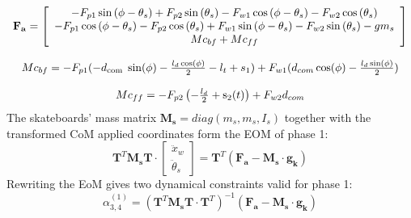 \footnotesize
\begin{equation}\label{e_Fi}
\begin{array}{c}
    \mathbf{F_{a}}= \left[\begin{array}{c}
-F_{p 1} \sin \left(\phi-\theta_s\right)+F_{p 2} \sin \left(\theta_s\right)-F_{w 1} \cos \left(\phi-\theta_s\right)-F_{w 2} \cos \left(\theta_s\right) \\
-F_{p 1} \cos \left(\phi-\theta_s\right)-F_{p 2} \cos \left(\theta_s\right)+F_{w 1} \sin \left(\phi-\theta_s\right)-F_{w 2} \sin \left(\theta_s\right)-g m_s \\
Mc_{bf} + Mc_{ff}
\end{array}\right] 
\\ \\
Mc_{bf} = -F_{p 1} (-d_{\text {com }} \sin (\phi)-\frac{l_d \cos (\phi)}{2}-l_t+s_1)+F_{w 1}(d_{c o m} \cos (\phi)-\frac{l_d \sin (\phi)}{2})
\\ \\
\footnotesize Mc_{ff} = -F_{p 2}\left(-\frac{l_d}{2}+\mathrm{s}_2(t)\right)+F_{w 2} d_{c o m}
\end{array}
\end{equation}  
\smallskip
\normalsize
The skateboards' mass matrix $\mathbf{M_s} = diag(m_s,m_s,I_s)$ together with the transformed CoM applied coordinates form the EOM of phase 1:
\begin{equation} \label{e_eoma}
    \mathbf{T}^T \mathbf{M_s} \mathbf{T} \cdot \left[\begin{array}{c}
         \ddot x_w  \\
         \ddot \theta_s 
    \end{array}\right] = \mathbf{T}^T (\mathbf{F_a} - \mathbf{M_s} \cdot \mathbf{g_k})
\end{equation}
Rewriting the EoM gives two dynamical constraints valid for phase 1:
\begin{equation}
    \alpha_{3,4}^{(1)} =   \left(\mathbf{T}^T \mathbf{M_s} \mathbf{T} \cdot  \mathbf{T}^T\right)^{-1} (\mathbf{F_a} - \mathbf{M_s} \cdot \mathbf{g_k})
\end{equation}

